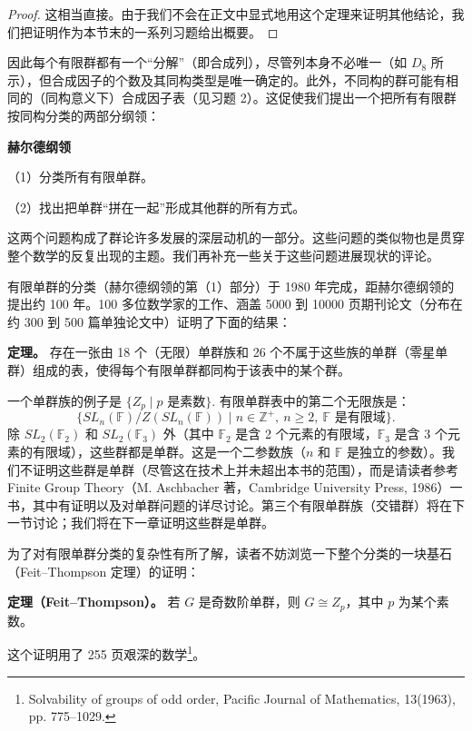 \begin{proof}
这相当直接。由于我们不会在正文中显式地用这个定理来证明其他结论，我们把证明作为本节末的一系列习题给出概要。
\end{proof}

因此每个有限群都有一个“分解”（即合成列），尽管列本身不必唯一（如 \(D_8\) 所示），但合成因子的个数及其同构类型是唯一确定的。此外，不同构的群可能有相同的（同构意义下）合成因子表（见习题 2）。这促使我们提出一个把所有有限群按同构分类的两部分纲领：

\textbf{赫尔德纲领}

（1）分类所有有限单群。

（2）找出把单群“拼在一起”形成其他群的所有方式。

这两个问题构成了群论许多发展的深层动机的一部分。这些问题的类似物也是贯穿整个数学的反复出现的主题。我们再补充一些关于这些问题进展现状的评论。

有限单群的分类（赫尔德纲领的第（1）部分）于 1980 年完成，距赫尔德纲领的提出约 100 年。100 多位数学家的工作、涵盖 5000 到 10000 页期刊论文（分布在约 300 到 500 篇单独论文中）证明了下面的结果：

\textbf{定理。} 存在一张由 18 个（无限）单群族和 26 个不属于这些族的单群（零星单群）组成的表，使得每个有限单群都同构于该表中的某个群。

一个单群族的例子是 \(\{Z_p \mid p \text{ 是素数}\}\). 有限单群表中的第二个无限族是：
\[
\{SL_n(\mathbb{F})/Z(SL_n(\mathbb{F})) \mid n \in \mathbb{Z}^+,\ n \geq 2,\ \mathbb{F} \text{ 是有限域}\}.
\]
除 \(SL_2(\mathbb{F}_2)\) 和 \(SL_2(\mathbb{F}_3)\) 外（其中 \(\mathbb{F}_2\) 是含 2 个元素的有限域，\(\mathbb{F}_3\) 是含 3 个元素的有限域），这些群都是单群。这是一个二参数族（\(n\) 和 \(\mathbb{F}\) 是独立的参数）。我们不证明这些群是单群（尽管这在技术上并未超出本书的范围），而是请读者参考 Finite Group Theory（M. Aschbacher 著，Cambridge University Press, 1986）一书，其中有证明以及对单群问题的详尽讨论。第三个有限单群族（交错群）将在下一节讨论；我们将在下一章证明这些群是单群。

为了对有限单群分类的复杂性有所了解，读者不妨浏览一下整个分类的一块基石（Feit--Thompson 定理）的证明：

\textbf{定理（Feit--Thompson）。} 若 \(G\) 是奇数阶单群，则 \(G \cong Z_p\)，其中 \(p\) 为某个素数。

这个证明用了 255 页艰深的数学\footnote{Solvability of groups of odd order, Pacific Journal of Mathematics, 13(1963), pp. 775--1029.}。


